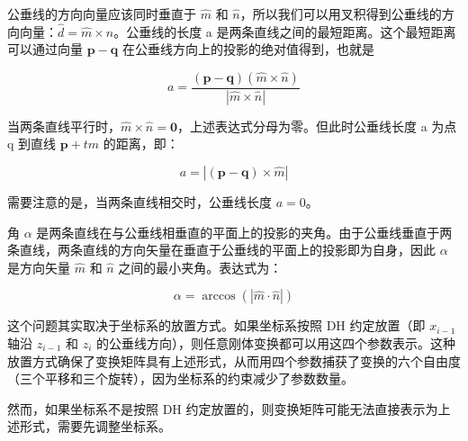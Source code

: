 \documentclass{homework}
\begin{document}
\begin{sol}

公垂线的方向向量应该同时垂直于 $ \hat{m} $ 和 $ \hat{n} $，所以我们可以用叉积得到公垂线的方向向量：$ \hat{d} = \hat{m} \times \hat{n} $。公垂线的长度 a 是两条直线之间的最短距离。这个最短距离可以通过向量 $ \mathbf{p} - \mathbf{q} $ 在公垂线方向上的投影的绝对值得到，也就是

\[
  a = \frac{(\mathbf{p} - \mathbf{q})(\hat{m} \times \hat{n})}{|\hat{m} \times \hat{n}|}
\]

当两条直线平行时，$ \hat{m} \times \hat{n} = \mathbf{0} $，上述表达式分母为零。但此时公垂线长度 a 为点 q 到直线 $ \mathbf{p} + t \hat{m} $ 的距离，即：

\[
  a = |(\mathbf{p} - \mathbf{q}) \times \hat{m}|
\]

需要注意的是，当两条直线相交时，公垂线长度 $ a = 0 $。

角 $ \alpha $ 是两条直线在与公垂线相垂直的平面上的投影的夹角。由于公垂线垂直于两条直线，两条直线的方向矢量在垂直于公垂线的平面上的投影即为自身，因此 $ \alpha $ 是方向矢量 $ \hat{m} $ 和 $ \hat{n} $ 之间的最小夹角。表达式为：

\[
  \alpha = \arccos (|\hat{m} \cdot \hat{n}|)
\]
  
\end{sol}

\question 

\begin{sol}

这个问题其实取决于坐标系的放置方式。如果坐标系按照 DH 约定放置（即 $ x_{i-1} $ 轴沿 $ z_{i-1} $ 和 $ z_i $ 的公垂线方向），则任意刚体变换都可以用这四个参数表示。这种放置方式确保了变换矩阵具有上述形式，从而用四个参数捕获了变换的六个自由度（三个平移和三个旋转），因为坐标系的约束减少了参数数量。

然而，如果坐标系不是按照 DH 约定放置的，则变换矩阵可能无法直接表示为上述形式，需要先调整坐标系。
  
\end{sol}

\question 
\end{document}
